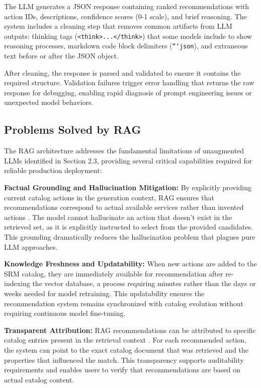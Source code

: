 The LLM generates a JSON response containing ranked recommendations with action IDs, descriptions, confidence scores (0-1 scale), and brief reasoning. The system includes a cleaning step that removes common artifacts from LLM outputs: thinking tags (\texttt{<think>...</think>}) that some models include to show reasoning processes, markdown code block delimiters (\texttt{```json}), and extraneous text before or after the JSON object.

After cleaning, the response is parsed and validated to ensure it contains the required structure. Validation failures trigger error handling that returns the raw response for debugging, enabling rapid diagnosis of prompt engineering issues or unexpected model behaviors.

\subsection{Problems Solved by RAG}

The RAG architecture addresses the fundamental limitations of unaugmented LLMs identified in Section 2.3, providing several critical capabilities required for reliable production deployment:

\textbf{Factual Grounding and Hallucination Mitigation:} By explicitly providing current catalog actions in the generation context, RAG ensures that recommendations correspond to actual available services rather than invented actions \cite{lewis2021retrievalaugmentedgenerationknowledgeintensivenlp}. The model cannot hallucinate an action that doesn't exist in the retrieved set, as it is explicitly instructed to select from the provided candidates. This grounding dramatically reduces the hallucination problem that plagues pure LLM approaches.

\textbf{Knowledge Freshness and Updatability:} When new actions are added to the SRM catalog, they are immediately available for recommendation after re-indexing the vector database, a process requiring minutes rather than the days or weeks needed for model retraining. This updatability ensures the recommendation system remains synchronized with catalog evolution without requiring continuous model fine-tuning.

\textbf{Transparent Attribution:} RAG recommendations can be attributed to specific catalog entries present in the retrieval context \cite{lewis2021retrievalaugmentedgenerationknowledgeintensivenlp}. For each recommended action, the system can point to the exact catalog document that was retrieved and the properties that influenced the match. This transparency supports auditability requirements and enables users to verify that recommendations are based on actual catalog content.


